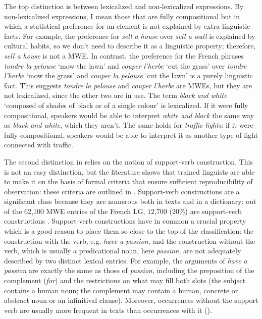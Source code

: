 \documentclass[output=paper]{langsci/langscibook}
\begin{document}

The top distinction is between lexicalized and non-lexicalized expressions. By non-lexicalized expressions, I mean those that are fully compositional but in which a statistical preference for an element is not explained by extra-linguistic facts. For example, the preference for \textit{sell a house} over \textit{sell a wall} is explained by cultural habits, so we don’t need to describe it as a linguistic property; therefore, \textit{sell a house} is not a MWE. In contrast, the preference for the French phrases \textit{tondre la pelouse} ‘mow the lawn’ and \textit{couper l’herbe} ‘cut the grass’ over \textit{tondre l’herbe} ‘mow the grass’ and \textit{couper la pelouse} ‘cut the lawn’ is a purely linguistic fact. This suggests \textit{tondre la pelouse} and \textit{couper l’herbe} are MWEs, but they are not lexicalized, since the other two are in use. The term\textit{ black and white} ‘composed of shades of black or of a single colour’ is lexicalized. If it were fully compositional, speakers would be able to interpret \textit{white and black} the same way as\textit{ black and white}, which they aren’t. The same holds for \textit{traffic lights}: if it were fully compositional, speakers would be able to interpret it as another type of light connected with traffic.

The second distinction in  relies on the notion of support-verb construction. This is not an easy distinction, but the literature shows that trained linguists are able to make it on the basis of formal criteria that ensure sufficient reproducibility of observation: these criteria are outlined in . Support-verb constructions are a significant class because they are numerous both in texts and in a dictionary: out of the 62,100 MWE entries of the French LG, 12,700 (20\%) are support-verb constructions \citep{Tolone2011}. Support-verb constructions have in common a crucial property which is a good reason to place them so close to the top of the classification: the construction with the verb, e.g. \textit{have a passion}, and the construction without the verb, which is usually a predicational noun, here \textit{passion}, are not adequately described by two distinct lexical entries. For example, the arguments of \textit{have a passion} are exactly the same as those of \textit{passion}, including the preposition of the complement (\textit{for}) and the restrictions on what may fill both slots (the subject contains a human noun; the complement may contain a human, concrete or abstract noun or an infinitival clause). Moreover, occurrences without the support verb are usually more frequent in texts than occurrences with it (\citealt{Laporte2008}).
\end{document}
